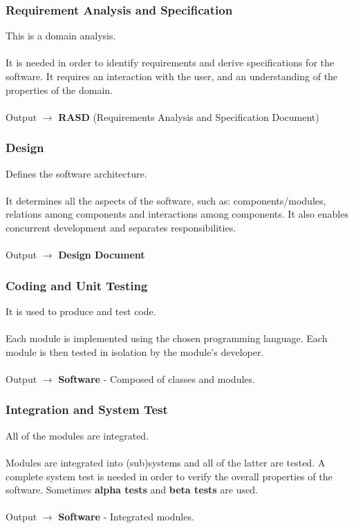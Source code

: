 \documentclass{article}
\begin{document}
\subsubsection{Requirement Analysis and Specification}
This is a domain analysis. \\ \\
It is needed in order to identify requirements and derive specifications for the software. It requires an interaction with the user, and an understanding of the properties of the domain. \\ \\
Output $\rightarrow$ \textbf{RASD} (Requirements Analysis and Specification Document)

\subsubsection{Design}
Defines the software architecture. \\ \\
It determines all the aspects of the software, such as: components/modules, relations among components and interactions among components. It also enables concurrent development and separates responsibilities. \\ \\
Output $\rightarrow$ \textbf{Design Document}

\subsubsection{Coding and Unit Testing}
It is used to produce and test code. \\ \\
Each module is implemented using the chosen programming language. Each module is then tested in isolation by the module's developer. \\ \\
Output $\rightarrow$ \textbf{Software} - Composed of classes and modules.

\subsubsection{Integration and System Test}
All of the modules are integrated. \\ \\
Modules are integrated into (sub)systems and all of the latter are tested. A complete system test is needed in order to verify the overall properties of the software. Sometimes \textbf{alpha tests} and \textbf{beta tests} are used. \\ \\
Output $\rightarrow$ \textbf{Software} - Integrated modules.
\end{document}
